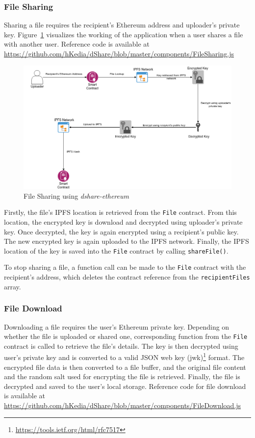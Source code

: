 			\subsubsection{File Sharing}
				Sharing a file requires the recipient's Ethereum address and uploader's private key. Figure~\ref{fig:ethereum-share} visualizes the working of the application when a user shares a file with another user. Reference code is available at \url{https://github.com/hKedia/dShare/blob/master/components/FileSharing.js}
				
				\begin{figure}[h]
					\includegraphics[width=\linewidth]{figures/ethereum-share}
					\caption{\label{fig:ethereum-share} File Sharing using \textit{dshare-ethereum}}
				\end{figure}
				
				Firstly, the file's IPFS location is retrieved from the \texttt{File} contract. From this location, the encrypted key is download and decrypted using uploader's private key. Once decrypted, the key is again encrypted using a recipient's public key. The new encrypted key is again uploaded to the IPFS network. Finally, the IPFS location of the key is saved into the \texttt{File} contract by calling \texttt{shareFile()}.
				
				To stop sharing a file, a function call can be made to the \texttt{File} contract with the recipient's address, which deletes the contract reference from the \texttt{recipientFiles} array.
			
			\subsubsection{File Download}
				Downloading a file requires the user's Ethereum private key. Depending on whether the file is uploaded or shared one, corresponding function from the \texttt{File} contract is called to retrieve the file's details. The key is then decrypted using user's private key and is converted to a valid JSON web key (jwk)\footnote{\url{https://tools.ietf.org/html/rfc7517}} format. The encrypted file data is then converted to a file buffer, and the original file content and the random salt used for encrypting the file is retrieved. Finally, the file is decrypted and saved to the user's local storage. Reference code for file download is available at \url{https://github.com/hKedia/dShare/blob/master/components/FileDownload.js}
			
